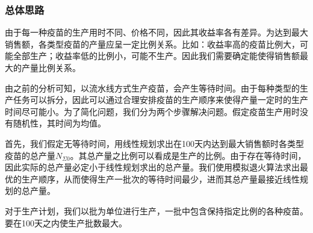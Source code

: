 \documentclass[UTF8]{ctexart}
\begin{document}
	\subsubsection{总体思路}
	由于每一种疫苗的生产用时不同、价格不同，因此其收益率各有差异。为达到最大销售额，各类型疫苗的产量应呈一定比例关系。比如：收益率高的疫苗比例大，可能全部生产；收益率低的比例小，可能不生产。因此我们需要确定能使得销售额最大的产量比例关系。
	\par 由之前的分析可知，以流水线方式生产疫苗，会产生等待时间。由于每种类型的生产任务可以拆分，因此可以通过合理安排疫苗的生产顺序来使得产量一定时的生产时间尽可能小。为了简化问题，我们分为两个步骤解决问题。假定疫苗生产用时没有随机性，其时间为均值。
	\par 首先，我们假定无等待时间，用线性规划求出在100天内达到最大销售额时各类型疫苗的总产量$N_{\Sigma 0}$。其总产量之比例可以看成是生产的比例。由于存在等待时间，因此实际的总产量必定小于线性规划求出的总产量。我们使用模拟退火算法求出最优的生产顺序，从而使得生产一批次的等待时间最少，进而其总产量最接近线性规划的总产量。
	\par 对于生产计划，我们以批为单位进行生产，一批中包含保持指定比例的各种疫苗。要在100天之内使生产批数最大。
\end{document}
